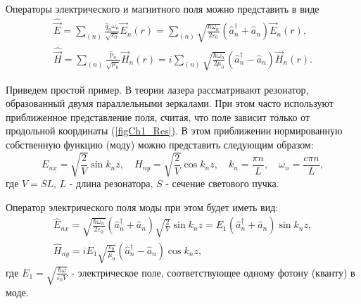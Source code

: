 Операторы электрического и магнитного поля можно представить в виде
\begin{eqnarray}
\hat{\vec{E}} = \sum_{(n)}\frac{\hat{q}_n
  \omega_n}{\sqrt{\varepsilon_0}} \vec{E}_n\left(r\right) = 
\sum_{(n)}\sqrt{\frac{\hbar \omega_n}{2 \varepsilon_0}}
\left(\hat{a}_n^{\dag} + \hat{a}_n \right)
\vec{E}_n\left(r\right),
\nonumber \\
\hat{\vec{H}} = \sum_{(n)}\frac{\hat{p}_n}
{\sqrt{\mu_0}} \vec{H}_n\left(r\right) = 
i \sum_{(n)}\sqrt{\frac{\hbar \omega_n}{2 \mu_0}}
\left(\hat{a}_n^{\dag} - \hat{a}_n \right)
\vec{H}_n\left(r\right).
\end{eqnarray}

Приведем простой пример. В теории лазера рассматривают резонатор,
образованный двумя параллельными зеркалами. При этом часто
используют приближенное представление поля, считая, что поле
зависит только от продольной координаты (\autoref{figCh1_Res}). В
этом приближении нормированную собственную функцию (моду) можно
представить следующим образом: 
\begin{equation}
E_{nx} = \sqrt{\frac{2}{V}} \sin k_n z,
\quad
H_{ny} = \sqrt{\frac{2}{V}} \cos k_n z,
\quad
k_n = \frac{\pi n}{L},
\quad
\omega_n = \frac{c \pi n}{L},
\end{equation}
где  $V = SL$,  $L$ - длина резонатора,  $S$ - сечение светового пучка.



Оператор электрического поля моды при этом будет иметь вид:
\begin{eqnarray}
\hat{E}_{nx} = 
\sqrt{\frac{\hbar \omega_n}{2 \varepsilon_0}}
\left(\hat{a}_n^{\dag} + \hat{a}_n \right)
\sqrt{\frac{2}{V}} \sin k_n z = 
E_1 \left(\hat{a}_n^{\dag} + \hat{a}_n \right) \sin k_n z, 
\nonumber \\
\hat{H}_{ny} = i E_1 \sqrt{\frac{\varepsilon_0}{\mu_0}}
\left(\hat{a}_n^{\dag} - \hat{a}_n \right) \cos k_n z,
\label{eqCh1_EH_simple}
\end{eqnarray}
где 
$E_1 = \sqrt{\frac{\hbar \omega}{\varepsilon_0 V}}$ - 
электрическое поле, соответствующее одному фотону (кванту) в
моде. 
